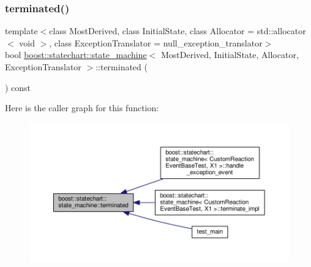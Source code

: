 \mbox{\label{classboost_1_1statechart_1_1state__machine_a78fc6d94ce7ba0ac18e0a83e96f3b215}} 
\subsubsection{\texorpdfstring{terminated()}{terminated()}}
{\footnotesize\ttfamily template$<$class Most\+Derived, class Initial\+State, class Allocator = std\+::allocator$<$ void $>$, class Exception\+Translator = null\+\_\+exception\+\_\+translator$>$ \\
bool \mbox{\hyperlink{classboost_1_1statechart_1_1state__machine}{boost\+::statechart\+::state\+\_\+machine}}$<$ Most\+Derived, Initial\+State, Allocator, Exception\+Translator $>$\+::terminated (\begin{DoxyParamCaption}{ }\end{DoxyParamCaption}) const\hspace{0.3cm}{\ttfamily [inline]}}

Here is the caller graph for this function\+:
\nopagebreak
\begin{figure}[H]
\begin{center}
\leavevmode
\includegraphics[width=350pt]{classboost_1_1statechart_1_1state__machine_a78fc6d94ce7ba0ac18e0a83e96f3b215_icgraph}
\end{center}
\end{figure}
\mbox{\label{classboost_1_1statechart_1_1state__machine_afe07725d4e0977f598d3747679cf64ca}} 
